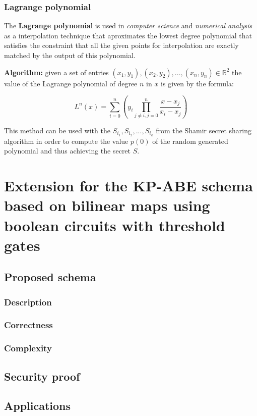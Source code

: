 \documentclass[12pt]{article}
\begin{document}
\subsubsection{Lagrange polynomial}

The \textbf{Lagrange polynomial} is used in \textit{computer science} and \textit{numerical analysis} as a interpolation technique that aproximates the lowest degree polynomial that satisfies the constraint that all the given points for interpolation are exactly matched by the output of this polynomial.

\textbf{Algorithm:} given a set of entries $(x_1, y_1), (x_2, y_2), ..., (x_n, y_n) \in \mathbb{R}^2$ the value of the Lagrange polynomial of degree $n$ in $x$ is given by the formula:

$$L^n(x) = \sum_{i = 0}^n(y_i\prod_{j \neq i, j = 0}^n \frac{x - x_j}{x_i - x_j})$$

This method can be used with the $S_{i_1}, S_{i_2}, ..., S_{i_k}$ from the Shamir secret sharing algorithm in order to compute the value $p(0)$ of the random generated polynomial and thus achieving the secret $S$.

\section{Extension for the KP-ABE schema based on bilinear maps using boolean circuits with threshold gates}

\subsection{Proposed schema}

\subsubsection{Description}
\subsubsection{Correctness}
\subsubsection{Complexity}

\subsection{Security proof}

\subsection{Applications}
\end{document}
